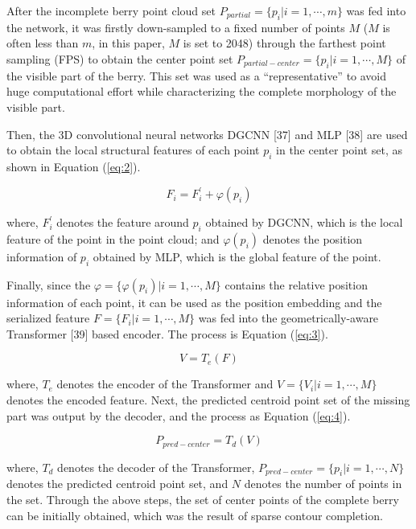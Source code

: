 \documentclass[12pt]{article}
\begin{document}
After the incomplete berry point cloud set $P_{partial}=\{p_i |i=1,\cdots,m\}$ was fed into the network, it was firstly down-sampled to a fixed number of points $M$ ($M$ is often less than $m$, in this paper, $M$ is set to 2048) through the farthest point sampling (FPS) to obtain the center point set $P_{partial-center}=\{p_i | i=1, \cdots, M\}$ of the visible part of the berry. 
This set was used as a ``representative'' to avoid huge computational effort while characterizing the complete morphology of the visible part.

Then, the 3D convolutional neural networks DGCNN [37] and MLP [38] are used to obtain the local structural features of each point $p_i$ in the center point set, as shown in Equation (\ref{eq:2}).

\begin{equation}
    F_i = F_{i}^{'} + \varphi(p_i)
    \label{eq:2}
\end{equation}

{\raggedright where, $F_{i}^{'}$ denotes the feature around $p_i$ obtained by DGCNN, which is the local feature of the point in the point cloud; and $\varphi(p_i)$ denotes the position information of $p_i$ obtained by MLP, which is the global feature of the point.}

Finally, since the $\varphi = \{ \varphi(p_i) |i=1, \cdots, M \}$ contains the relative position information of each point, it can be used as the position embedding and the serialized feature $F = \{F_i | i=1, \cdots, M \}$ was fed into the geometrically-aware Transformer [39] based encoder. 
The process is Equation (\ref{eq:3}).

\begin{equation}
    V = T_e(F)
    \label{eq:3}
\end{equation}

{\raggedright where, $T_e$ denotes the encoder of the Transformer and $V=\{V_i |i=1, \cdots, M\}$ denotes the encoded feature. 
Next, the predicted centroid point set of the missing part was output by the decoder, and the process as Equation (\ref{eq:4}).}

\begin{equation}
    P_{pred-center} = T_d(V)
    \label{eq:4}
\end{equation}

{\raggedright where, $T_d$ denotes the decoder of the Transformer, $P_{pred-center}=\{p_i |i=1,\cdots,N\}$ denotes the predicted centroid point set, and $N$ denotes the number of points in the set. 
Through the above steps, the set of center points of the complete berry can be initially obtained, which was the result of sparse contour completion.}
\end{document}
